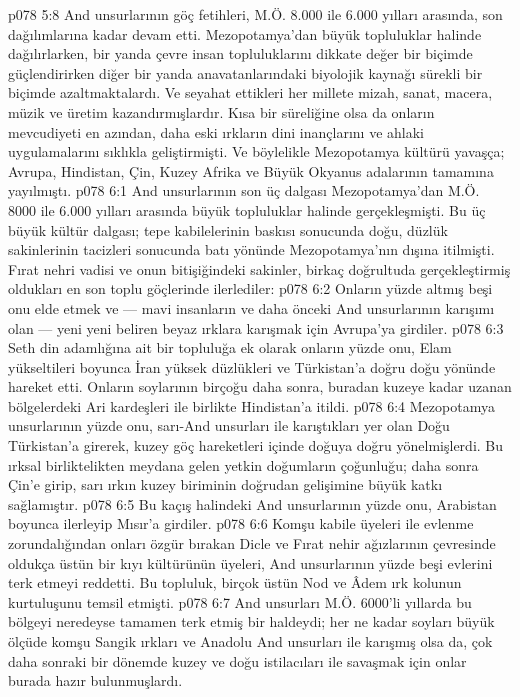 \vs p078 5:8 And unsurlarının göç fetihleri, M.Ö. 8.000 ile 6.000 yılları arasında, son dağılımlarına kadar devam etti. Mezopotamya’dan büyük topluluklar halinde dağılırlarken, bir yanda çevre insan topluluklarını dikkate değer bir biçimde güçlendirirken diğer bir yanda anavatanlarındaki biyolojik kaynağı sürekli bir biçimde azaltmaktalardı. Ve seyahat ettikleri her millete mizah, sanat, macera, müzik ve üretim kazandırmışlardır. Kısa bir süreliğine olsa da onların mevcudiyeti en azından, daha eski ırkların dini inançlarını ve ahlaki uygulamalarını sıklıkla geliştirmişti. Ve böylelikle Mezopotamya kültürü yavaşça; Avrupa, Hindistan, Çin, Kuzey Afrika ve Büyük Okyanus adalarının tamamına yayılmıştı.
\vs p078 6:1 And unsurlarının son üç dalgası Mezopotamya’dan M.Ö. 8000 ile 6.000 yılları arasında büyük topluluklar halinde gerçekleşmişti. Bu üç büyük kültür dalgası; tepe kabilelerinin baskısı sonucunda doğu, düzlük sakinlerinin tacizleri sonucunda batı yönünde Mezopotamya’nın dışına itilmişti. Fırat nehri vadisi ve onun bitişiğindeki sakinler, birkaç doğrultuda gerçekleştirmiş oldukları en son toplu göçlerinde ilerlediler:
\vs p078 6:2 Onların yüzde altmış beşi onu elde etmek ve --- mavi insanların ve daha önceki And unsurlarının karışımı olan --- yeni yeni beliren beyaz ırklara karışmak için Avrupa’ya girdiler.
\vs p078 6:3 Seth din adamlığına ait bir topluluğa ek olarak onların yüzde onu, Elam yükseltileri boyunca İran yüksek düzlükleri ve Türkistan’a doğru doğu yönünde hareket etti. Onların soylarının birçoğu daha sonra, buradan kuzeye kadar uzanan bölgelerdeki Ari kardeşleri ile birlikte Hindistan’a itildi.
\vs p078 6:4 Mezopotamya unsurlarının yüzde onu, sarı\hyp{}And unsurları ile karıştıkları yer olan Doğu Türkistan’a girerek, kuzey göç hareketleri içinde doğuya doğru yönelmişlerdi. Bu ırksal birliktelikten meydana gelen yetkin doğumların çoğunluğu; daha sonra Çin’e girip, sarı ırkın kuzey biriminin doğrudan gelişimine büyük katkı sağlamıştır.
\vs p078 6:5 Bu kaçış halindeki And unsurlarının yüzde onu, Arabistan boyunca ilerleyip Mısır’a girdiler.
\vs p078 6:6 Komşu kabile üyeleri ile evlenme zorundalığından onları özgür bırakan Dicle ve Fırat nehir ağızlarının çevresinde oldukça üstün bir kıyı kültürünün üyeleri, And unsurlarının yüzde beşi evlerini terk etmeyi reddetti. Bu topluluk, birçok üstün Nod ve Âdem ırk kolunun kurtuluşunu temsil etmişti.
\vs p078 6:7 And unsurları M.Ö. 6000’li yıllarda bu bölgeyi neredeyse tamamen terk etmiş bir haldeydi; her ne kadar soyları büyük ölçüde komşu Sangik ırkları ve Anadolu And unsurları ile karışmış olsa da, çok daha sonraki bir dönemde kuzey ve doğu istilacıları ile savaşmak için onlar burada hazır bulunmuşlardı.
